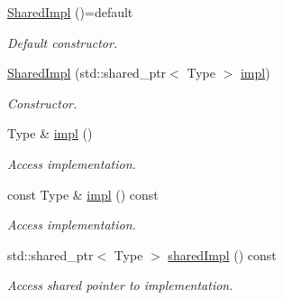 \begin{DoxyCompactItemize}
\item 
\hypertarget{classSpacy_1_1Mixin_1_1SharedImpl_a7dd29c741019b4cd328c78240863650f}{}\hyperlink{classSpacy_1_1Mixin_1_1SharedImpl_a7dd29c741019b4cd328c78240863650f}{Shared\+Impl} ()=default\label{classSpacy_1_1Mixin_1_1SharedImpl_a7dd29c741019b4cd328c78240863650f}

\begin{DoxyCompactList}\small\item\em Default constructor. \end{DoxyCompactList}\item 
\hyperlink{classSpacy_1_1Mixin_1_1SharedImpl_adb1654ae10f14d0328173982f5dc67b4_adb1654ae10f14d0328173982f5dc67b4}{Shared\+Impl} (std\+::shared\+\_\+ptr$<$ Type $>$ \hyperlink{classSpacy_1_1Mixin_1_1SharedImpl_a4bed4faca68901d0dd463c4234fb2fe6}{impl})
\begin{DoxyCompactList}\small\item\em Constructor. \end{DoxyCompactList}\item 
\hypertarget{classSpacy_1_1Mixin_1_1SharedImpl_a4bed4faca68901d0dd463c4234fb2fe6}{}Type \& \hyperlink{classSpacy_1_1Mixin_1_1SharedImpl_a4bed4faca68901d0dd463c4234fb2fe6}{impl} ()\label{classSpacy_1_1Mixin_1_1SharedImpl_a4bed4faca68901d0dd463c4234fb2fe6}

\begin{DoxyCompactList}\small\item\em Access implementation. \end{DoxyCompactList}\item 
\hypertarget{classSpacy_1_1Mixin_1_1SharedImpl_abb98e0ffa576cf5e5c895022dd089891}{}const Type \& \hyperlink{classSpacy_1_1Mixin_1_1SharedImpl_abb98e0ffa576cf5e5c895022dd089891}{impl} () const \label{classSpacy_1_1Mixin_1_1SharedImpl_abb98e0ffa576cf5e5c895022dd089891}

\begin{DoxyCompactList}\small\item\em Access implementation. \end{DoxyCompactList}\item 
\hypertarget{classSpacy_1_1Mixin_1_1SharedImpl_ae6c02a4f669e17e0b2a9c78afd1ade09}{}std\+::shared\+\_\+ptr$<$ Type $>$ \hyperlink{classSpacy_1_1Mixin_1_1SharedImpl_ae6c02a4f669e17e0b2a9c78afd1ade09}{shared\+Impl} () const \label{classSpacy_1_1Mixin_1_1SharedImpl_ae6c02a4f669e17e0b2a9c78afd1ade09}

\begin{DoxyCompactList}\small\item\em Access shared pointer to implementation. \end{DoxyCompactList}\end{DoxyCompactItemize}


